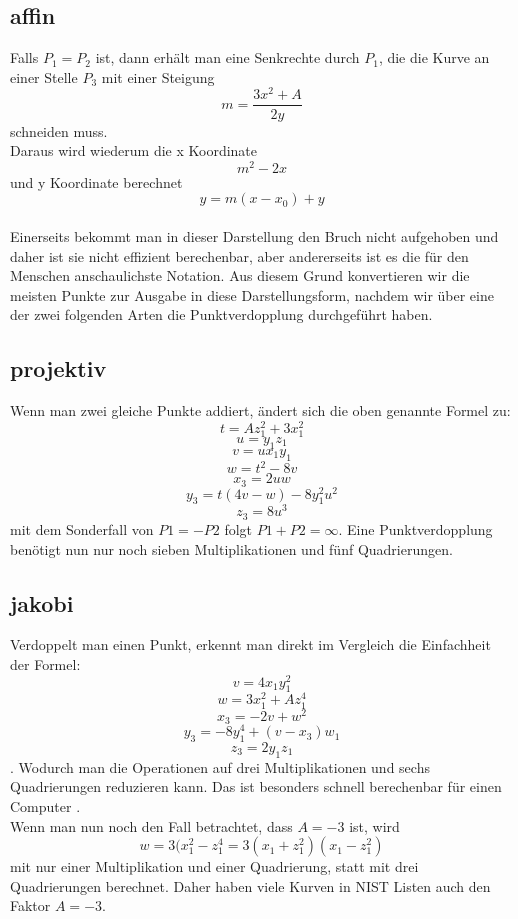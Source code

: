 \subsection{affin}
Falls \(P_1 = P_2\) ist, dann erhält man eine Senkrechte durch \(P_1\), die die Kurve an einer Stelle \(P_3\) mit einer Steigung \[m = \frac{3x^2+A}{2y}\] schneiden muss.\\
Daraus wird wiederum die x Koordinate \[m^2-2x\] und y Koordinate berechnet \[y = m(x - x_0)+y\]\\ Einerseits bekommt man in dieser Darstellung den Bruch nicht aufgehoben und daher ist sie nicht effizient berechenbar, aber andererseits ist es die für den Menschen anschaulichste Notation. Aus diesem Grund konvertieren wir die meisten Punkte zur Ausgabe in diese Darstellungsform, nachdem wir über eine der zwei folgenden Arten die Punktverdopplung durchgeführt haben.
\subsection{projektiv}
Wenn man zwei gleiche Punkte addiert, ändert sich die oben genannte Formel zu:
\[t = Az_1^2 + 3x_1^2\] \[u = y_1z_1\] \[v = ux_1y_1\] \[w = t^2 - 8v\] \[x_3 = 2uw\] \[y_3 = t(4v-w)- 8y_1^2u^2\] \[z_3 = 8u^3\] mit dem Sonderfall von \(P1 = -P2\) folgt \(P1 + P2 = \infty\). Eine Punktverdopplung benötigt nun nur noch sieben Multiplikationen und fünf Quadrierungen.
\subsection{jakobi}
Verdoppelt man einen Punkt, erkennt man direkt im Vergleich die Einfachheit der Formel:
\[v = 4x_1y_1^2\] \[w = 3x_1^2 + Az_1^4\] \[x_3 = -2v + w^2\] \[y_3 = -8y_1^4 + (v-x_3)w_1\] \[z_3 = 2y_1z_1\]. Wodurch man die Operationen auf drei Multiplikationen und sechs Quadrierungen reduzieren kann. Das ist besonders schnell berechenbar für einen Computer \cite{Washington2003}.\\
Wenn man nun noch den Fall betrachtet, dass \(A = -3\) ist, wird \[w = 3(x_1^2 - z_1^4 = 3(x_1 + z_1^2)(x_1 - z_1^2)\] mit nur einer Multiplikation und einer Quadrierung, statt mit drei Quadrierungen berechnet. Daher haben viele Kurven in NIST Listen auch den Faktor \(A = -3\).